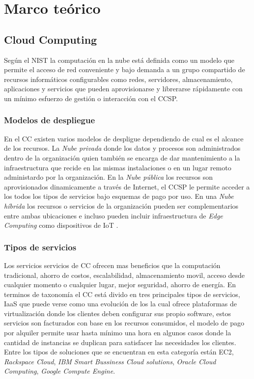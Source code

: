 \section{Marco teórico}
\subsection{Cloud Computing}
Según el \acrshort{NIST} la computación en la nube está definida como un modelo que permite el acceso de red conveniente y bajo demanda a un grupo compartido de recursos informáticos configurables como redes, servidores, almacenamiento, aplicaciones y servicios que pueden aprovisionarse y librerarse rápidamente con un mínimo esfuerzo de gestión o interacción con el \acrshort{CCSP}\cite{liu2011nist}.
\bigskip

\subsubsection{Modelos de despliegue}
En el \acrshort{CC} existen varios modelos de despligue dependiendo de cual es el alcance de los recursos. La \emph{Nube privada} donde los datos y procesos son administrados dentro de la organización quien también se encarga de dar mantenimiento a la infraestructura que recide en las mismas instalaciones o en un lugar remoto administardo por la organización. En la \emph{Nube pública} los recursos son aprovisionados dinamicamente a través de Internet, el \acrshort{CCSP} le permite acceder a los todos los tipos de servicios bajo esquemas de pago por uso. En una \emph{Nube híbrida} los recursos o servicios de la organización pueden ser complementarios entre ambas ubicaciones e incluso pueden incluir infraestructura de \emph{Edge Computing} como dispositivos de \acrshort{IoT} \cite[p.2]{choudhary2007software}.

\subsubsection{Tipos de servicios}
Los servicios servicios de \acrshort{CC} ofrecen mas beneficios que la computación tradicional, ahorro de costos, escalabilidad, almacenamiento movil, acceso desde cualquier momento o cualquier lugar, mejor seguridad, ahorro de energía\cite{sether2016cloud}. En terminos de taxonomía el \acrshort{CC} está divido en tres principales tipos de servicios, \acrfull{IaaS} que puede verse como una evolución de los  la cual ofrece plataformas de virtualización donde los clientes deben configurar sus propio software, estos servicios son facturados con base en los recursos consumidos, el modelo de pago por alquiler permite usar hasta mínimo una hora en algunos casos donde la cantidad de instancias se duplican para satisfacer las necesidades los clientes. Entre los tipos de soluciones que se encuentran en esta categoría están \acrfull{EC2}, \emph{Rackspace Cloud}, \emph{IBM Smart Bussiness Cloud solutions}, \emph{Oracle Cloud Computing}, \emph{Google Compute Engine}. \cite[p.2]{sether2016cloud}\bigskip

